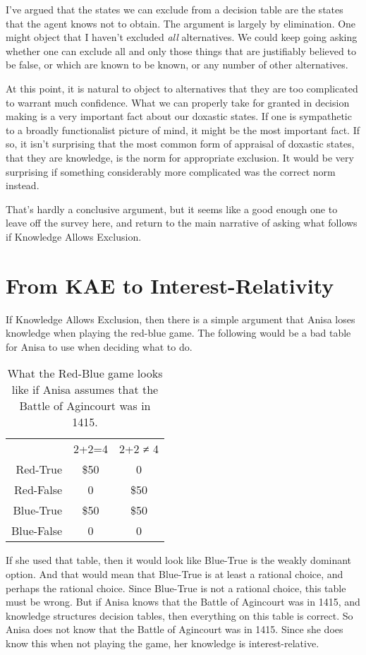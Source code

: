 \documentclass[
  12pt,
  letterpaper,
]{scrbook}
\begin{document}
I've argued that the states we can exclude from a decision table are the
states that the agent knows not to obtain. The argument is largely by
elimination. One might object that I haven't excluded \emph{all}
alternatives. We could keep going asking whether one can exclude all and
only those things that are justifiably believed to be false, or which
are known to be known, or any number of other alternatives.

At this point, it is natural to object to alternatives that they are too
complicated to warrant much confidence. What we can properly take for
granted in decision making is a very important fact about our doxastic
states. If one is sympathetic to a broadly functionalist picture of
mind, it might be the most important fact. If so, it isn't surprising
that the most common form of appraisal of doxastic states, that they are
knowledge, is the norm for appropriate exclusion. It would be very
surprising if something considerably more complicated was the correct
norm instead.

That's hardly a conclusive argument, but it seems like a good enough one
to leave off the survey here, and return to the main narrative of asking
what follows if Knowledge Allows Exclusion.

\section{From KAE to Interest-Relativity}\label{sec-from-kae-to-irt}

If Knowledge Allows Exclusion, then there is a simple argument that
Anisa loses knowledge when playing the red-blue game. The following
would be a bad table for Anisa to use when deciding what to do.

\begin{longtable}[]{@{}rcc@{}}
\caption{What the Red-Blue game looks like if Anisa assumes that the
Battle of Agincourt was in
1415.}\label{tbl-assume-agincourt}\tabularnewline
\toprule\noalign{}
\endfirsthead
\endhead
\bottomrule\noalign{}
\endlastfoot
~ & 2+2=4 & 2+2 ≠ 4 \\
Red-True & \$50 & 0 \\
Red-False & 0 & \$50 \\
Blue-True & \$50 & \$50 \\
Blue-False & 0 & 0 \\
\end{longtable}

If she used that table, then it would look like Blue-True is the weakly
dominant option. And that would mean that Blue-True is at least a
rational choice, and perhaps the rational choice. Since Blue-True is not
a rational choice, this table must be wrong. But if Anisa knows that the
Battle of Agincourt was in 1415, and knowledge structures decision
tables, then everything on this table is correct. So Anisa does not know
that the Battle of Agincourt was in 1415. Since she does know this when
not playing the game, her knowledge is interest-relative.
\end{document}
